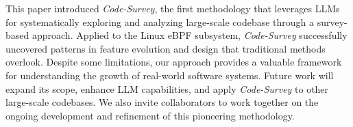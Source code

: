 \documentclass[sigconf,review,anonymous]{acmart}
\begin{document}
This paper introduced \emph{Code-Survey}, the first methodology that leverages LLMs for systematically exploring and analyzing large-scale codebase through a survey-based approach. Applied to the Linux eBPF subsystem, \emph{Code-Survey} successfully uncovered patterns in feature evolution and design that traditional methods overlook. Despite some limitations, our approach provides a valuable framework for understanding the growth of real-world software systems. Future work will expand its scope, enhance LLM capabilities, and apply \emph{Code-Survey} to other large-scale codebases. We also invite collaborators to work together on the ongoing development and refinement of this pioneering methodology.


    
    
\end{document}
